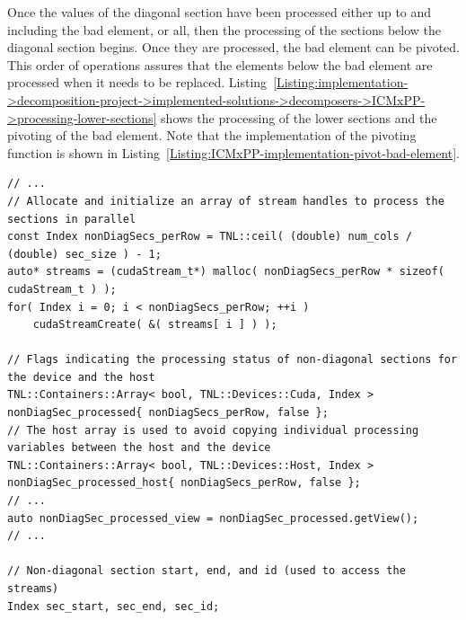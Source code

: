 Once the values of the diagonal section have been processed either up to and including the bad element, or all, then the processing of the sections below the diagonal section begins. Once they are processed, the bad element can be pivoted. This order of operations assures that the elements below the bad element are processed when it needs to be replaced. Listing~\ref{Listing:implementation->decomposition-project->implemented-solutions->decomposers->ICMxPP->processing-lower-sections} shows the processing of the lower sections and the pivoting of the bad element. Note that the implementation of the pivoting function is shown in Listing~\ref{Listing:ICMxPP-implementation-pivot-bad-element}.

\begin{lstlisting}[caption={An excerpt from the definition of the overloaded \code{decompose()} method for the ICM\_\textit{x}PP decomposer. The excerpt highlights how the processing of lower sections, i.e., sections below a diagonal section, is implemented. The \code{LSecCompute\_kernel()} and \code{NonDiagSecAssign\_kernel()} kernels compute and assign values of the lower sections, respectively. The kernels are presented separately in Listings~\ref{Listing:ICMxPP-implementation->kernels->lower-section-compute} and \ref{Listing:ICMxPP-implementation->kernels->nondiagonal-assign}.},label={Listing:implementation->decomposition-project->implemented-solutions->decomposers->ICMxPP->processing-lower-sections},escapechar=@]
// ...
// Allocate and initialize an array of stream handles to process the sections in parallel
const Index nonDiagSecs_perRow = TNL::ceil( (double) num_cols / (double) sec_size ) - 1;
auto* streams = (cudaStream_t*) malloc( nonDiagSecs_perRow * sizeof( cudaStream_t ) );
for( Index i = 0; i < nonDiagSecs_perRow; ++i )
	cudaStreamCreate( &( streams[ i ] ) );

// Flags indicating the processing status of non-diagonal sections for the device and the host
TNL::Containers::Array< bool, TNL::Devices::Cuda, Index > nonDiagSec_processed{ nonDiagSecs_perRow, false };
// The host array is used to avoid copying individual processing variables between the host and the device
TNL::Containers::Array< bool, TNL::Devices::Host, Index > nonDiagSec_processed_host{ nonDiagSecs_perRow, false };
// ...
auto nonDiagSec_processed_view = nonDiagSec_processed.getView();
// ...

// Non-diagonal section start, end, and id (used to access the streams)
Index sec_start, sec_end, sec_id;


\end{lstlisting}
